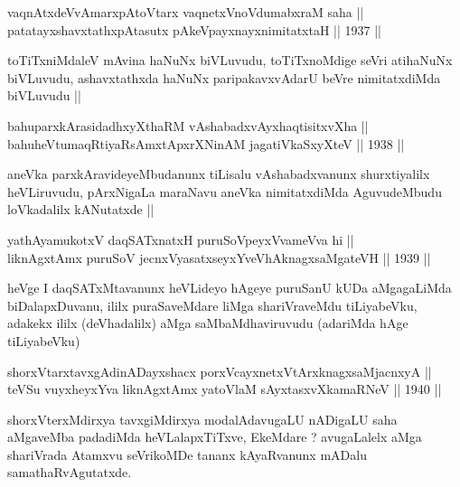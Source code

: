 \begin{shl}
vaqnAtxdeVvA\s \s marxpAtoV\s tarx vaqnetxVnoVdumabxraM saha ||  \\
patatayxshavxtathxpAtasutx pAkeV\s payxnayxnimitatxtaH ||  1937 ||  
\end{shl}

\begin{artha}
toTiTxniMdaleV mAvina haNuNx biVLuvudu, toTiTxnoMdige seVri atihaNuNx
biVLuvudu, ashavxtathxda haNuNx paripakavxvAdarU beVre nimitatxdiMda
biVLuvudu ||
\end{artha}

\begin{shl}
bahuparxkArasidadhxyXthaRM vAshabadxvAyxhaqtisitxvXha ||  \\
bahuheVtumaqRtiyaRsAmxtApxrXNinAM jagatiVkaSxyXteV ||  1938 ||  
\end{shl}

\begin{artha}
aneVka parxkAravideyeMbudanunx tiLisalu vAshabadxvanunx shurxtiyalilx
heVLiruvudu, pArxNigaLa maraNavu aneVka nimitatxdiMda AguvudeMbudu
loVkadalilx kANutatxde ||
\end{artha}

\begin{shl}
yathA\s yamukotxV daqSATxnatxH puruSoV\s peyxVvameVva hi ||  \\
liknAgxtAmx puruSoV jecnxVyasatxseyxYveVhAknagxsaMgateVH ||  1939 ||  
\end{shl}

\begin{artha}
heVge I daqSATxMtavanunx heVLideyo hAgeye puruSanU kUDa aMgagaLiMda
biDalapxDuvanu, ililx puraSaveMdare liMga shariVraveMdu tiLiyabeVku,
adakekx ililx (deVhadalilx) aMga saMbaMdhaviruvudu (adariMda hAge tiLiyabeVku)
\end{artha}


\begin{shl}
shorxVtarxtavxgAdinADayxshacx porxVcayxnetxV\s tArxknagxsaMjacnxyA || \\
teVSu vuyxheyxYva liknAgxtAmx yatoV\s laM sAyxtasxvXkamaRNeV ||  1940 ||  
\end{shl}

\begin{artha}
shorxVterxMdirxya tavxgiMdirxya modalAdavugaLU nADigaLU saha aMgaveMba
padadiMda heVLalapxTiTxve, EkeMdare ? avugaLalelx aMga shariVrada
Atamxvu seVrikoMDe tananx kAyaRvanunx mADalu samathaRvAgutatxde.
\end{artha}

